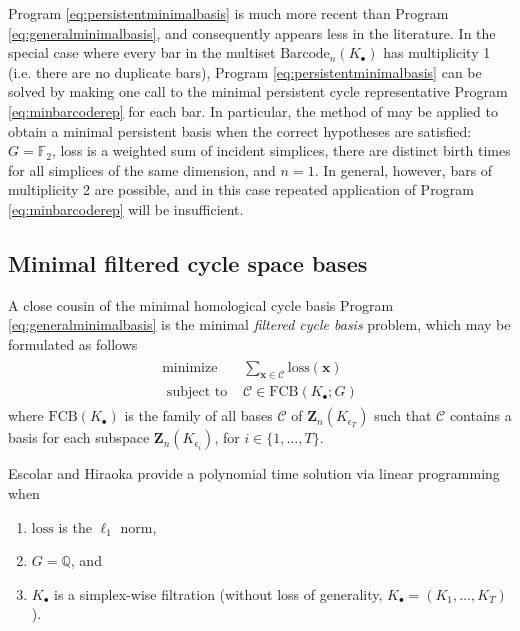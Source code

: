 \documentclass[11pt,onecolumn]{article}
\newcommand{\Q}{\mathbb{Q}}
\newcommand{\field}{\mathbb{F}}
\newcommand{\Cycles}[0]{\mathbf{Z}}
\newcommand{\optimalrep}{\mathbf{x}}
\newcommand{\barcode}{\mathrm{Barcode}}
\newcommand{\loss}{\mathrm{loss}}
\newcommand{\fcyclebasis}{\mathcal{C}}
\newcommand{\setoffilteredcyclebases}{\mathrm{FCB}}
\newcommand{\pr}{Program }
\theoremstyle{plain}
\theoremstyle{definition}
\begin{document}
\pr \eqref{eq:persistentminimalbasis} is much more recent than \pr \eqref{eq:generalminimalbasis}, and consequently appears less in the literature. In the special case where every bar in the multiset $\barcode_n(K_\bullet)$ has multiplicity 1 (i.e. there are no duplicate bars), \pr \eqref{eq:persistentminimalbasis} can be solved by making one call to the minimal persistent cycle representative \pr \eqref{eq:minbarcoderep} for each bar.   In particular, the method of \cite{chenquantifying} may be applied to obtain a minimal persistent basis when the correct hypotheses are satisfied: $G = \field_2$, loss is a weighted sum of incident simplices, there are distinct birth times for all simplices of the same dimension, and $n=1$. In general, however, bars of multiplicity 2 are possible, and in this case repeated application of \pr \eqref{eq:minbarcoderep} will be insufficient.  

\subsection{Minimal filtered cycle space bases}

A close cousin of the minimal homological cycle basis \pr \eqref{eq:generalminimalbasis} is the minimal \emph{filtered cycle basis} problem, which may be formulated as  follows
\begin{align}
   \begin{split}
    \text{minimize } & \textstyle \sum_{\optimalrep \in \fcyclebasis} \loss(\optimalrep) \\
    \text{ subject to } & \fcyclebasis \in \setoffilteredcyclebases(K_\bullet ; G)
   \end{split}
   \label{eq:filteredminimalbasis}
\end{align}
where $\setoffilteredcyclebases(K_\bullet)$ is the family of all bases $\fcyclebasis$ of $\Cycles_n(K_{\epsilon_T})$ such that $\fcyclebasis$ contains a basis for each  subspace $\Cycles_n(K_{\epsilon_i})$, for $i \in \{1, \ldots, T\}$.  

Escolar and Hiraoka \cite{Escolar2016} provide a polynomial time solution via linear programming when
    \begin{enumerate}
        \item $\loss$ is the $\ell_1$ norm,
        \item $G = \Q$, and
        \item $K_\bullet$ is a simplex-wise filtration (without loss of generality, $K_\bullet = (K_1, \ldots, K_T)$).
    \end{enumerate}
    
\end{document}
